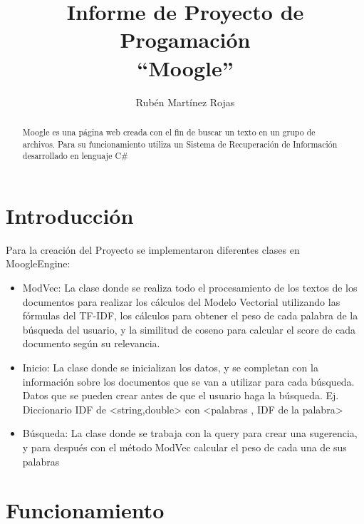 \documentclass[12pt, a4paper]{article}
\title{Informe de Proyecto de Progamación\\ “Moogle”}
\author{Rubén Martínez Rojas}
\date{}
\begin{document}
\begin{titlepage}
    \maketitle
\end{titlepage}

\begin{abstract}
    Moogle es una página web creada con el fin de buscar
    un texto en un grupo de archivos. Para su funcionamiento
    utiliza un Sistema de Recuperación de Información
    desarrollado en lenguaje C\#
\end{abstract}

\section{Introducción}

Para la creación del Proyecto se implementaron diferentes clases en MoogleEngine:
\begin{itemize}
    \item ModVec: La clase donde se realiza todo el procesamiento de los textos de los documentos
          para realizar los cálculos del Modelo Vectorial utilizando las fórmulas del TF-IDF,
          los cálculos para obtener el peso de cada palabra de la búsqueda del usuario,
          y la similitud de coseno para calcular el score de cada documento según su relevancia.
    \item Inicio: La clase donde se inicializan los datos, y se completan con la información sobre
          los documentos que se van a utilizar para cada búsqueda. Datos que se pueden crear
          antes de que el usuario haga la búsqueda.
          Ej. Diccionario IDF de <string,double> con <palabras , IDF de la palabra>
    \item Búsqueda: La clase donde se trabaja con la query para crear una sugerencia,
          y para después con el método ModVec calcular el peso de cada una de sus palabras

\end{itemize}
\section{Funcionamiento}
\end{document}
